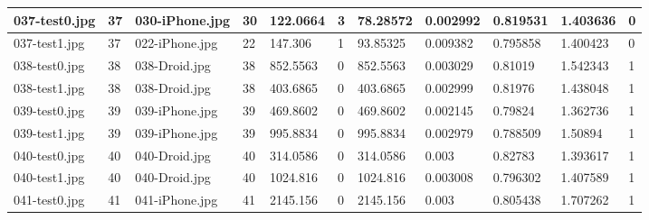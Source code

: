 \begin{landscape}
\begin{longtable}{|p{2cm}|p{1cm}|p{2cm}|p{1cm}|p{2cm}|p{1cm}|p{2cm}|p{2cm}|p{2cm}|p{2cm}|p{1cm}|}
		037-test0.jpg   & 37               & 030-iPhone.jpg        & 30                          & 122.0664              & 3                       & 78.28572                   & 0.002992              & 0.819531              & 1.403636                 & 0                \\ \hline
		037-test1.jpg   & 37               & 022-iPhone.jpg        & 22                          & 147.306               & 1                       & 93.85325                   & 0.009382              & 0.795858              & 1.400423                 & 0                \\ \hline
		038-test0.jpg   & 38               & 038-Droid.jpg         & 38                          & 852.5563              & 0                       & 852.5563                   & 0.003029              & 0.81019               & 1.542343                 & 1                \\ \hline
		038-test1.jpg   & 38               & 038-Droid.jpg         & 38                          & 403.6865              & 0                       & 403.6865                   & 0.002999              & 0.81976               & 1.438048                 & 1                \\ \hline
		039-test0.jpg   & 39               & 039-iPhone.jpg        & 39                          & 469.8602              & 0                       & 469.8602                   & 0.002145              & 0.79824               & 1.362736                 & 1                \\ \hline
		039-test1.jpg   & 39               & 039-iPhone.jpg        & 39                          & 995.8834              & 0                       & 995.8834                   & 0.002979              & 0.788509              & 1.50894                  & 1                \\ \hline
		040-test0.jpg   & 40               & 040-Droid.jpg         & 40                          & 314.0586              & 0                       & 314.0586                   & 0.003                 & 0.82783               & 1.393617                 & 1                \\ \hline
		040-test1.jpg   & 40               & 040-Droid.jpg         & 40                          & 1024.816              & 0                       & 1024.816                   & 0.003008              & 0.796302              & 1.407589                 & 1                \\ \hline
		041-test0.jpg   & 41               & 041-iPhone.jpg        & 41                          & 2145.156              & 0                       & 2145.156                   & 0.003                 & 0.805438              & 1.707262                 & 1                \\ \hline

\end{longtable}
\end{landscape}
